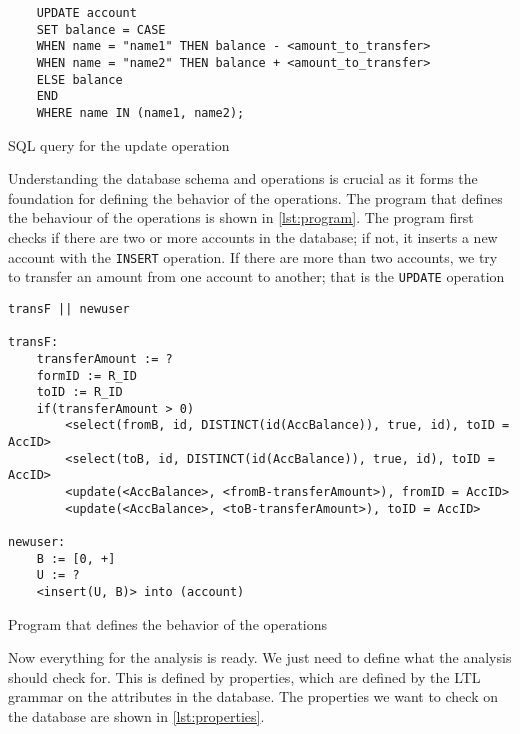 \begin{listing}[htb!]
    \begin{verbatim}
    UPDATE account
    SET balance = CASE
    WHEN name = "name1" THEN balance - <amount_to_transfer>
    WHEN name = "name2" THEN balance + <amount_to_transfer>
    ELSE balance
    END
    WHERE name IN (name1, name2);
    \end{verbatim}
    \caption{SQL query for the update operation}
    \label{lst:sql-queries2}
\end{listing}


Understanding the database schema and operations is crucial as it forms the foundation for defining the behavior of the operations.
The program that defines the behaviour of the operations is shown in \autoref{lst:program}.
The program first checks if there are two or more accounts in the database; if not, it inserts a new account with the \texttt{INSERT} operation.
If there are more than two accounts, we try to transfer an amount from one account to another; that is the \texttt{UPDATE} operation



\begin{listing}[htb!]
    \begin{verbatim}
transF || newuser

transF:
    transferAmount := ?
    formID := R_ID
    toID := R_ID
    if(transferAmount > 0)
        <select(fromB, id, DISTINCT(id(AccBalance)), true, id), toID = AccID>
        <select(toB, id, DISTINCT(id(AccBalance)), true, id), toID = AccID>
        <update(<AccBalance>, <fromB-transferAmount>), fromID = AccID>
        <update(<AccBalance>, <toB-transferAmount>), toID = AccID>

newuser:
    B := [0, +]
    U := ?
    <insert(U, B)> into (account)
    \end{verbatim}
    \caption{Program that defines the behavior of the operations}
    \label{lst:program}
\end{listing}


Now everything for the analysis is ready.
We just need to define what the analysis should check for.
This is defined by properties, which are defined by the LTL grammar on the attributes in the database.
The properties we want to check on the database are shown in \autoref{lst:properties}.

